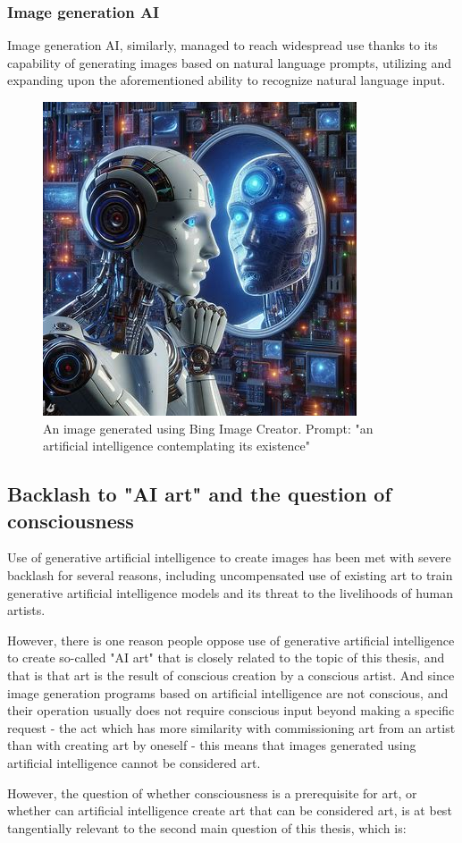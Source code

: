 \documentclass[masterthesis]{fer}
\begin{document}
\subsubsection{Image generation AI}
Image generation AI, similarly, managed to
reach widespread use thanks to its capability of
generating images based on natural language
prompts, utilizing and expanding upon the
aforementioned ability to recognize natural
language input.
\begin{figure}[htb]
  \centering
  \includegraphics[width=0.38\linewidth]{Figures/bing image creator prompt 1a.jpeg} 
  \caption{An image generated using Bing Image Creator. Prompt: "an artificial intelligence contemplating its existence"}
  \label{slk:bing_image}
\end{figure}
\subsection{Backlash to "AI art" and the question of consciousness}
Use of generative artificial intelligence to
create images has been met with severe backlash
for several reasons, including uncompensated use
of existing art to train generative artificial
intelligence models and its threat to the
livelihoods of human artists.

However, there is one reason people oppose use of generative artificial intelligence to create so-called "AI art" that is closely related to the topic of this thesis, and that is that art is the result of conscious creation by a conscious artist. And since image generation programs based on artificial intelligence are not conscious, and their operation usually does not require conscious input beyond making a specific request - the act which has more similarity with commissioning art from an artist than with creating art by oneself - this means that images generated using artificial intelligence cannot be considered art.

However, the question of whether consciousness is a prerequisite for art, or whether can artificial intelligence create art that can be considered art, is at best tangentially relevant to the second main question of this thesis, which is:
\end{document}
